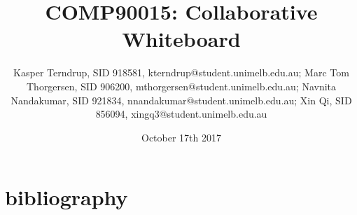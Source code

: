 \documentclass[11pt,a4paper,article,oneside]{memoir}
\title{COMP90015: Collaborative Whiteboard}
\author{Kasper Terndrup, SID 918581, kterndrup@student.unimelb.edu.au;
	Marc Tom Thorgersen, SID 906200, mthorgersen@student.unimelb.edu.au;
        Navnita Nandakumar, SID 921834, nnandakumar@student.unimelb.edu.au;
        Xin Qi, SID 856094, xingq3@student.unimelb.edu.au}
\date{October 17th 2017}
\begin{document}
\maketitle







\newpage


\part{bibliography}
\printbibliography
\end{document}
